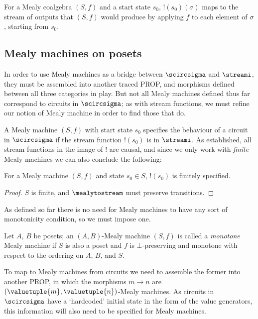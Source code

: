 For a Mealy coalgebra \((S, f)\) and a start state \(s_0\),
\(!(s_0)(\sigma)\) maps to the stream of outputs that \((S, f)\) would produce
by applying \(f\) to each element of \(\sigma\), starting from \(s_0\).

\subsection{Mealy machines on posets}

In order to use Mealy machines as a bridge between \(\scircsigma\) and
\(\streami\), they must be assembled into another traced PROP, and morphisms
defined between all three categories in play.
But not all Mealy machines defined thus far correspond to circuits in
\(\scircsigma\); as with stream functions, we must refine our notion of Mealy
machine in order to find those that do.

A Mealy machine \((S, f)\) with start state \(s_0\) specifies the behaviour of a
circuit in \(\scircsigma\) if the stream function \(!(s_0)\) is in \(\streami\).
As established, all stream functions in the image of \(!\) are causal, and since
we only work with \emph{finite} Mealy machines we can also conclude the
following:

\begin{lemma}
    For a Mealy machine \((S, f)\) and state \(s_0 \in S\), \(!(s_0)\)
    is finitely specified.
\end{lemma}
\begin{proof}
    \(S\) is finite, and \(\mealytostream\) must preserve transitions.
\end{proof}

As defined so far there is no need for Mealy machines to have any sort of
monotonicity condition, so we must impose one.

\begin{definition}
    Let \(A\), \(B\) be posets; an \((A,B)\)-Mealy machine \((S, f)\)
    is called a \emph{monotone} Mealy machine if \(S\) is also a poset and
    \(f\) is \(\bot\)-preserving and monotone with respect to the ordering on
    \(A\), \(B\), and \(S\).
\end{definition}

To map to Mealy machines from circuits we need to assemble the former into
another PROP, in which the morphisms \(m \to n\) are
\((\valuetuple{m},\valuetuple{n})\)-Mealy machines.
As circuits in \(\scircsigma\) have a `hardcoded' initial state in the form of
the value generators, this information will also need to be specified for Mealy
machines.

